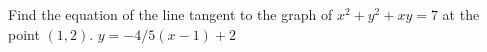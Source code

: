 {Find the equation of the line tangent to the graph of $x^2+y^2+xy=7$ at the point $(1,2)$. 
}
{ $y=-4/5(x-1)+2$
}
